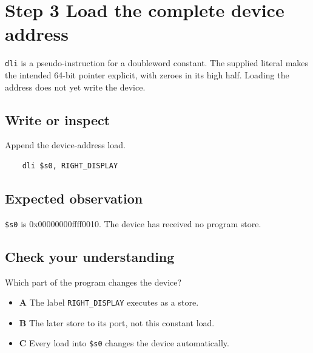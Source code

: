 \section{Step 3 Load the complete device
  address}\label{005-seven-segment-counter-s03-step-3-load-the-complete-device-address}

\texttt{dli} is a pseudo-instruction for a doubleword constant. The
supplied literal makes the intended 64-bit pointer explicit, with zeroes
in its high half. Loading the address does not yet write the device.

\subsection{Write or
  inspect}\label{005-seven-segment-counter-s03-write-or-inspect}

Append the device-address load.

\begin{verbatim}
    dli $s0, RIGHT_DISPLAY
\end{verbatim}

\subsection{Expected
  observation}\label{005-seven-segment-counter-s03-expected-observation}

\texttt{\$s0} is 0x00000000ffff0010. The device has received no program
store.

\subsection{Check your
  understanding}\label{005-seven-segment-counter-s03-check-your-understanding}

Which part of the program changes the device?

\begin{itemize}
  \tightlist
  \item
        \textbf{A} The label \texttt{RIGHT\_DISPLAY} executes as a store.
  \item
        \textbf{B} The later store to its port, not this constant load.
  \item
        \textbf{C} Every load into \texttt{\$s0} changes the device
        automatically.
\end{itemize}

